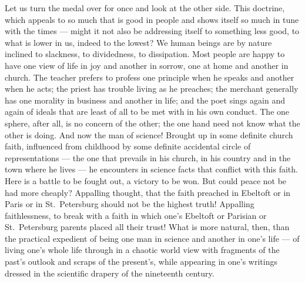 \documentclass[12pt,a4paper]{book}
\newcommand{\opage}[1]{\marginnote{\footnotesize\textit{[#1]}}}
\begin{document}
\opage{12}Let us turn the medal over for once and look at the other side. This
doctrine, which appeals to so much that is good in people and shows itself so
much in tune with the times --- might it not also be addressing itself to
something less good, to what is lower in us, indeed to the lowest? We human
beings are by nature inclined to slackness, to dividedness, to dissipation. Most
people are happy to have one view of life in joy and another in sorrow, one at
home and another in church. The teacher prefers to profess one principle when
he speaks and another when he acts; the priest has trouble living as he
preaches; the merchant generally has one morality in business and another in
life; and the poet sings again and again of
\opage{13}ideals that are least of all to be met with in his own conduct. The
one sphere, after all, is no concern of the other; the one hand need not know
what the other is doing. And now the man of science! Brought up in some
definite church faith, influenced from childhood by some definite accidental
circle of representations --- the one that prevails in his church, in his
country and in the town where he lives --- he encounters in science facts that
conflict with this faith. Here is a battle to be fought out, a victory to be
won. But could peace not be had more cheaply? Appalling thought, that the faith
preached in Ebeltoft or in Paris or in St.\ Petersburg should not be the
highest truth! Appalling faithlessness, to break with a faith in which one's
Ebeltoft or Parisian or St.\ Petersburg parents placed all their trust! What is
more natural, then, than the practical expedient of being one man in science
and another in one's life --- of living one's whole life through in a chaotic
world view with fragments of the past's outlook and scraps of the present's,
while appearing in one's writings dressed in the scientific drapery of the
nineteenth century.
\end{document}
